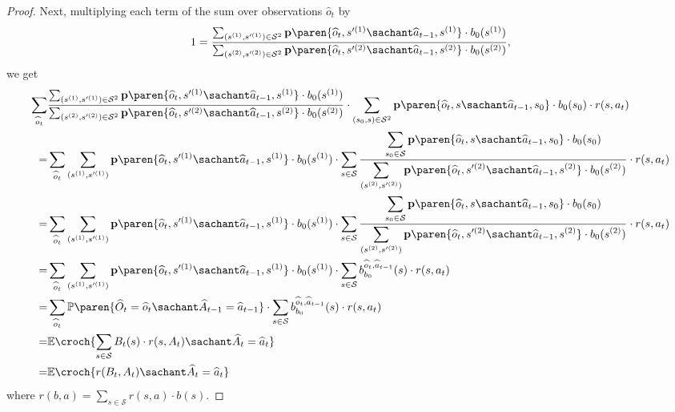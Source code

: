 \begin{proof}
Next, multiplying each term of the sum over observations $\widehat{o}_t$ by
\[ 1 =  \dfrac{ \sum_{(s^{(1)}, s'^{(1)}) \in \mathcal{S}^2} \textbf{p} \paren{ \widehat{o}_t, s'^{(1)} \sachant \widehat{a}_{t-1}, s^{(1)} } \cdot b_0(s^{(1)}) }{ \sum_{(s^{(2)}, s'^{(2)}) \in \mathcal{S}^2}\textbf{p} \paren{ \widehat{o}_t, s'^{(2)} \sachant \widehat{a}_{t-1}, s^{(2)} } \cdot b_0(s^{(2)}) },\]
we get
\begin{align}
\nonumber \sum_{ \widehat{o}_t} &	\dfrac{ \sum_{(s^{(1)}, s'^{(1)}) \in \mathcal{S}^2} \textbf{p} \paren{ \widehat{o}_t, s'^{(1)} \sachant \widehat{a}_{t-1}, s^{(1)} } \cdot b_0(s^{(1)}) }{ \sum_{(s^{(2)}, s'^{(2)}) \in \mathcal{S}^2}\textbf{p} \paren{ \widehat{o}_t, s'^{(2)} \sachant \widehat{a}_{t-1}, s^{(2)} } \cdot b_0(s^{(2)}) } \cdot \sum_{(s_0,s) \in \mathcal{S}^2} \textbf{p} \paren{ \widehat{o}_t, s \sachant \widehat{a}_{t-1}, s_0 } \cdot b_0(s_0) \cdot r(s,a_t) \\
\nonumber =& \sum_{ \widehat{o}_t} \sum_{(s^{(1)}, s'^{(1)})} \textbf{p} \paren{ \widehat{o}_t, s'^{(1)} \sachant \widehat{a}_{t-1}, s^{(1)} } \cdot b_0(s^{(1)}) \cdot \sum_{s \in \mathcal{S}} \dfrac{ \displaystyle \sum_{s_0 \in \mathcal{S}} \textbf{p} \paren{ \widehat{o}_t, s \sachant \widehat{a}_{t-1}, s_0 } \cdot b_0(s_0) }{ \displaystyle \sum_{(s^{(2)}, s'^{(2)})}\textbf{p} \paren{ \widehat{o}_t, s'^{(2)} \sachant \widehat{a}_{t-1}, s^{(2)} } \cdot b_0(s^{(2)}) } \cdot r(s,a_t) \\
\nonumber =& \sum_{ \widehat{o}_t} \sum_{(s^{(1)}, s'^{(1)})} \textbf{p} \paren{ \widehat{o}_t, s'^{(1)} \sachant \widehat{a}_{t-1}, s^{(1)} } \cdot b_0(s^{(1)}) \cdot \sum_{s \in \mathcal{S}} \dfrac{ \displaystyle \sum_{s_0 \in \mathcal{S}} \textbf{p} \paren{ \widehat{o}_t, s \sachant \widehat{a}_{t-1}, s_0 } \cdot b_0(s_0) }{ \displaystyle \sum_{(s^{(2)}, s'^{(2)})}\textbf{p} \paren{ \widehat{o}_t, s'^{(2)} \sachant \widehat{a}_{t-1}, s^{(2)} } \cdot b_0(s^{(2)}) } \cdot r(s,a_t) \\
\nonumber =& \sum_{ \widehat{o}_t} \sum_{(s^{(1)}, s'^{(1)})} \textbf{p} \paren{ \widehat{o}_t, s'^{(1)} \sachant \widehat{a}_{t-1}, s^{(1)} } \cdot b_0(s^{(1)}) \cdot \sum_{s \in \mathcal{S}} b^{\widehat{o}_t,\widehat{a}_{t-1}}_{b_0} (s) \cdot r(s,a_t)\\
\nonumber =& \sum_{ \widehat{o}_t} \mathbb{P} \paren{ \widehat{O}_t = \widehat{o}_t \sachant \widehat{A}_{t-1} = \widehat{a}_{t-1} } \cdot \sum_{s \in \mathcal{S}} b^{\widehat{o}_t,\widehat{a}_{t-1}}_{b_0} (s) \cdot r(s,a_t)\\
\nonumber =& \mathbb{E} \croch{ \sum_{s \in \mathcal{S}} B_t(s) \cdot r(s,A_t) \sachant \widehat{A}_{t} = \widehat{a}_{t} }\\
\nonumber =& \mathbb{E} \croch{ r(B_t,A_t) \sachant \widehat{A}_{t} = \widehat{a}_{t} }
\end{align}
where $r(b,a) = \sum_{s \in \mathcal{S}} r(s,a) \cdot b(s)$.
\end{proof}










